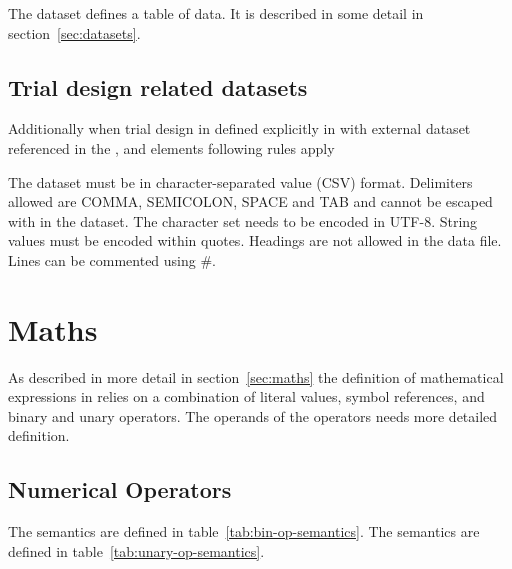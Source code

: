 The dataset defines a table of data. It is described in some detail in
section~\ref{sec:datasets}.

\begin{valrules}
\end{valrules}

\subsection{Trial design related datasets}
Additionally when trial design in defined explicitly in \pml with external dataset 
referenced in the ,  and 
 elements following rules apply
\begin{valrules}
 The dataset must be in character-separated value 
(CSV) format.
 Delimiters allowed are COMMA, SEMICOLON, SPACE 
and TAB and cannot be escaped with in the dataset.
 The character set needs to be encoded in UTF-8.
 String values must be encoded within quotes.
 Headings are not allowed in the data file.
 Lines can be commented using \#.
\end{valrules}


\section{Maths}
\label{sec:phmaths-defns}

As described in more detail in section~\ref{sec:maths} the definition
of mathematical expressions in \pharmml relies on a combination of
literal values, symbol references, and binary and unary
operators. The operands of the operators needs more detailed
definition.

\subsection{Numerical Operators}

\begin{valrules}
 The semantics are defined in
table~\ref{tab:bin-op-semantics}.
 The semantics are defined in
table~\ref{tab:unary-op-semantics}.
\end{valrules}


